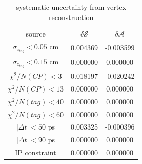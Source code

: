 \begin{table}[htpb]
	\begin{minipage}[b]{1.0\linewidth}
		\centering
		\caption{systematic uncertainty from vertex reconstruction}
		\label{tab:sy_vertex}
		\begin{tabular}{c c c}
			\hline
			source & $\delta \mathcal{S}$ & $\delta \mathcal{A}$ \\
			$\sigma_{z_{tag}}<0.05$ cm & 0.004369
& -0.003599
\\
			$\sigma_{z_{tag}}<0.15$ cm & 0.000000 & 0.000000 \\
			$\chi^2/N(CP)<3$ & 0.018197
& -0.020242
\\
			$\chi^2/N(CP)<13$ & 0.000000 & 0.000000\\
			$\chi^2/N(tag)<40$ & 0.000000
& 0.000000
\\
			$\chi^2/N(tag)<60$ & 0.000000 & 0.000000\\
			$|\Delta t|<50 $ ps & 0.003325
& -0.000396
\\
			$|\Delta t|<90 $ ps & 0.000000 & 0.000000\\
			IP constraint & 0.000000& 0.000000\\
						\hline
		\end{tabular}
	\end{minipage}
\end{table}

